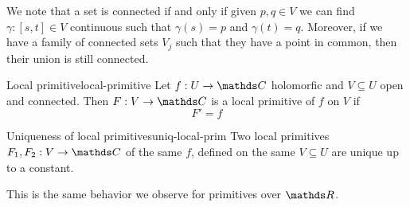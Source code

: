 \documentclass[12pt]{extarticle}
\begin{document}
We note that a set is connected if and only if given $p, q \in V$ we can find $\gamma: [s, t] \in V$
continuous such that $\gamma(s) = p$ and $\gamma(t) = q$.
Moreover, if we have a family of connected sets $V_j$ such that they have a point in common, then
their union is still connected.

\begin{definition}{Local primitive}{local-primitive}
	Let $f: U \to \C$ holomorfic and $V \subseteq U$ open and connected.
	Then $F: V \to \C$ is a local primitive of $f$ on $V$ if
	\begin{equation}
		F' = f
	\end{equation}
\end{definition}

\begin{proposition}{Uniqueness of local primitives}{uniq-local-prim}
	Two local primitives $F_1, F_2: V \to \C$ of the same $f$, defined on the same $V \subseteq U$
	are unique up to a constant.
\end{proposition}

This is the same behavior we observe for primitives over $\R$.
\end{document}
